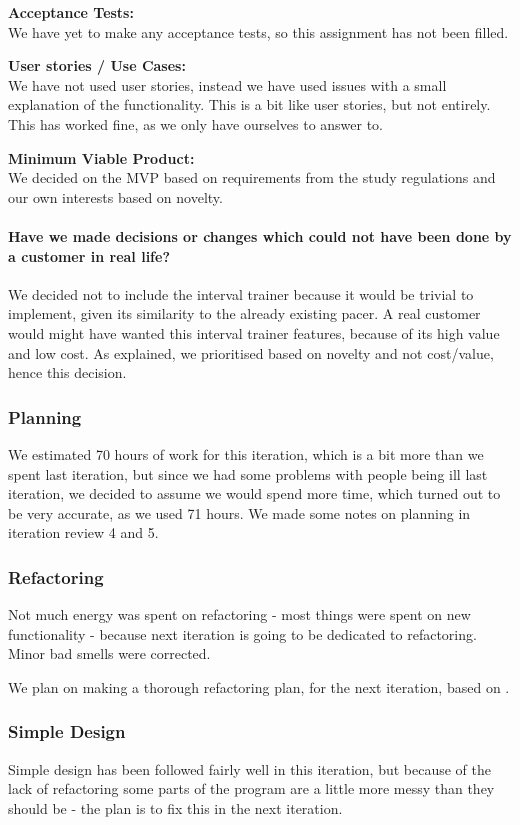 \textbf{Acceptance Tests:}\\
We have yet to make any acceptance tests, so this assignment has not been filled.

\textbf{User stories / Use Cases:}\\
We have not used user stories, instead we have used issues with a small explanation of the functionality. This is a bit like user stories, but not entirely. This has worked fine, as we only have ourselves to answer to.

\textbf{Minimum Viable Product:}\\
We decided on the MVP based on requirements from the study regulations and our own interests based on novelty.

\paragraph{Have we made decisions or changes which could not have been done by a customer in real life?}
We decided not to include the interval trainer because it would be trivial to implement, given its similarity to the already existing pacer.
A real customer would might have wanted this interval trainer features, because of its high value and low cost. As explained, we prioritised based on novelty and not cost/value, hence this decision.



\subsubsection{Planning}
We estimated 70 hours of work for this iteration, which is a bit more than we spent last iteration, but since we had some problems with people being ill last iteration, we decided to assume we would spend more time, which turned out to be very accurate, as we used 71 hours. We made some notes on planning in iteration review 4 and 5.

\subsubsection{Refactoring}
Not much energy was spent on refactoring - most things were spent on new functionality - because next iteration is going to be dedicated to refactoring.
Minor bad smells were corrected.

We plan on making a thorough refactoring plan, for the next iteration, based on \citep{fowler:refac}.

\subsubsection{Simple Design}
Simple design has been followed fairly well in this iteration, but because of the lack of refactoring some parts of the program are a little more messy than they should be - the plan is to fix this in the next iteration.


